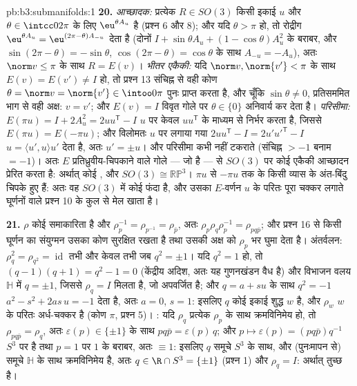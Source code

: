 \begin{solution}{pb:b3:submanifolds:1}
\textbf{20.} \emph{आच्छादक:} प्रत्येक $R \in SO(3)$ किसी इकाई $u$ और $\theta \in
\intcc0{2\pi}$
के लिए $\eu^{\theta A_u}$ है (प्रश्न 6 और 8); और यदि $\theta > \pi$ हो, तो रोद्रीग $\eu^{\theta A_u} = \eu^{(2\pi -
\theta)A_{-u}}$
देता है (दोनों $I + \sin\theta A_u + (1 -
\cos\theta)A_u^2$ के बराबर, और $\sin(2\pi -
\theta) = -\sin\theta$, $\cos(2\pi - \theta) =
\cos\theta$ के साथ $A_{-u} = -A_u$), अतः
$\norm v \leq \pi$ के साथ $R = E(v)$। \emph{भीतर एकैकी:} यदि $\norm v, \norm{v'} < \pi$ के साथ $E(v) = E(v') \neq I$ हो,
तो प्रश्न 13 संचिह्न से वही कोण $\theta = \norm v = \norm{v'} \in \intoo0\pi$ पुनः प्राप्त करता है, और चूँकि
$\sin\theta \neq 0$, प्रतिसममित भाग से वही अक्ष: $v = v'$; और $E(v) = I$ विवृत गोले पर
$\theta \in \{0\}$ अनिवार्य कर देता है। \emph{परिसीमा:} $E(\pi u) = I + 2A_u^2 = 2uu^{\mathsf T} - I$ $u$ पर केवल $uu^{\mathsf T}$
के माध्यम से निर्भर करता है, जिससे $E(\pi u) =
E(-\pi u)$; और विलोमतः $u$ पर लगाया
गया $2uu^{\mathsf T} - I =
2u'u'^{\mathsf T} - I$ $u = \langle
u', u\rangle u'$ देता है, अतः $u' = \pm u$।  और परिसीमा कभी नहीं टकराते
(संचिह्न $> -1$ बनाम $= -1$)। अतः $E$ प्रतिध्रुवीय-चिपकाने वाले गोले
--- जो  है --- से $SO(3)$ पर कोई  एकैकी आच्छादन प्रेरित करता
है: अर्थात् कोई , और $SO(3)
\cong \mathbb{RP}^3$। $\pi u$ से $-\pi u$ तक के किसी
व्यास के अंत-बिंदु चिपके हुए हैं: अतः वह $SO(3)$ में कोई फंदा है, और
उसका $E$-वर्णन $u$ के परितः पूरा चक्कर लगाते घूर्णनों वाले प्रश्न
10 के कुल से मेल खाता है।

\textbf{21.} $\rho$ कोई समाकारिता है और $\rho_p^{-1} =
\rho_{p^{-1}} = \rho_{\bar p}$, अतः $\rho_p\rho_q\rho_p^{-1}
= \rho_{pq\bar p}$; और प्रश्न
16 से किसी घूर्णन का संयुग्मन उसका कोण सुरक्षित रखता है तथा उसकी अक्ष
को $\rho_p$ भर घुमा देता है। अंतर्वलन: $\rho_q^2 = \rho_{q^2} = \operatorname{id}$ तभी और केवल तभी जब $q^2 = \pm1$।
यदि $q^2 = 1$ हो, तो $(q - 1)(q + 1) = q^2 -
1 = 0$ (केंद्रीय अदिश, अतः यह गुणनखंडन वैध है) और
विभाजन वलय $\mathbb H$ में $q = \pm1$, जिससे $\rho_q
= I$ मिलता है, जो अपवर्जित है;
और $q = a +
su$ के साथ $q^2 = -1$ $a^2 - s^2 + 2as\,u = -1$ देता है, अतः $a = 0$, $s = 1$: इसलिए $q$
कोई इकाई शुद्ध $w$ है, और $\rho_w$ $w$ के परितः अर्ध-चक्कर है (कोण
$\pi$, प्रश्न 5)। : यदि $\rho_q$ प्रत्येक $\rho_p$ के साथ क्रमविनिमेय
हो, तो $\rho_{pq\bar p} = \rho_q$, अतः $\varepsilon(p) \in
\{\pm1\}$ के साथ $pq\bar p = \varepsilon(p)\,q$; और $p \mapsto \varepsilon(p) = (pq\bar p)q^{-1}$  $S^3$ पर 
है तथा $p =
1$ पर $1$ के बराबर, अतः $\equiv 1$: इसलिए $q$ समूचे $S^3$
के साथ, और (पुनःमापन से) समूचे $\mathbb H$ के साथ क्रमविनिमेय है, अतः $q \in \R \cap S^3 =
\{\pm1\}$
(प्रश्न 1) और $\rho_q = I$: अर्थात्  तुच्छ है।


\end{solution}
